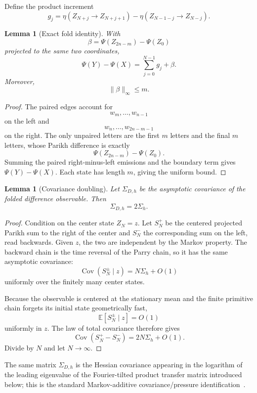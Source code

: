 \documentclass[12pt]{article}
\newtheorem{lemma}[theorem]{Lemma}
\theoremstyle{definition}
\begin{document}
Define the product increment
\[
g_j
=
\eta(Z_{N+j}\to Z_{N+j+1})
-
\eta(Z_{N-1-j}\to Z_{N-j}).
\]

\begin{lemma}[Exact fold identity]
\label{lem:fold}
With
\[
\beta
=
\Psi(Z_{2n-m})-\Psi(Z_0)
\]
projected to the same two coordinates,
\[
\boxed{
\Psi(Y)-\Psi(X)
=
\sum_{j=0}^{N-1}g_j+\beta.
}
\]
Moreover,
\[
\|\beta\|_\infty\le m.
\]
\end{lemma}

\begin{proof}
The paired edges account for
\[
w_m,\ldots,w_{n-1}
\]
on the left and
\[
w_n,\ldots,w_{2n-m-1}
\]
on the right. The only unpaired letters are the first \(m\) letters and the final \(m\) letters, whose Parikh difference is exactly
\[
\Psi(Z_{2n-m})-\Psi(Z_0).
\]
Summing the paired right-minus-left emissions and the boundary term gives \(\Psi(Y)-\Psi(X)\). Each state has length \(m\), giving the uniform bound.
\end{proof}

\begin{lemma}[Covariance doubling]
\label{lem:cov2}
Let \(\Sigma_{D,h}\) be the asymptotic covariance of the folded difference observable. Then
\[
\boxed{\Sigma_{D,h}=2\Sigma_h.}
\]
\end{lemma}

\begin{proof}
Condition on the center state \(Z_N=z\). Let \(S_N^+\) be the centered projected Parikh sum to the right of the center and \(S_N^-\) the corresponding sum on the left, read backwards. Given \(z\), the two are independent by the Markov property. The backward chain is the time reversal of the Parry chain, so it has the same asymptotic covariance:
\[
\operatorname{Cov}(S_N^\pm\mid z)
=
N\Sigma_h+O(1)
\]
uniformly over the finitely many center states.

Because the observable is centered at the stationary mean and the finite primitive chain forgets its initial state geometrically fast,
\[
\mathbb E[S_N^\pm\mid z]=O(1)
\]
uniformly in \(z\). The law of total covariance therefore gives
\[
\operatorname{Cov}(S_N^+-S_N^-)
=
2N\Sigma_h+O(1).
\]
Divide by \(N\) and let \(N\to\infty\).
\end{proof}

The same matrix \(\Sigma_{D,h}\) is the Hessian covariance appearing in the logarithm of the leading eigenvalue of the Fourier-tilted product transfer matrix introduced below; this is the standard Markov-additive covariance/pressure identification~\cite{Herve2010}.
\end{document}
